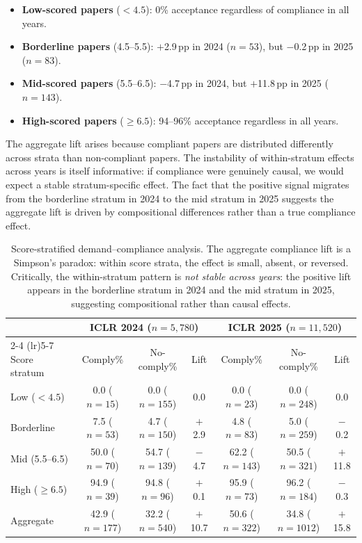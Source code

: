 \documentclass{article}
\begin{document}
\begin{itemize}[leftmargin=*]
\item \textbf{Low-scored papers} ($< 4.5$): 0\% acceptance regardless of compliance in all years.
\item \textbf{Borderline papers} (4.5--5.5): $+$2.9\,pp in 2024 ($n = 53$), but $-$0.2\,pp in 2025 ($n = 83$).
\item \textbf{Mid-scored papers} (5.5--6.5): $-$4.7\,pp in 2024, but $+$11.8\,pp in 2025 ($n = 143$).
\item \textbf{High-scored papers} ($\geq 6.5$): 94--96\% acceptance regardless in all years.
\end{itemize}

The aggregate lift arises because compliant papers are distributed differently across strata than non-compliant papers. The instability of within-stratum effects across years is itself informative: if compliance were genuinely causal, we would expect a stable stratum-specific effect. The fact that the positive signal migrates from the borderline stratum in 2024 to the mid stratum in 2025 suggests the aggregate lift is driven by compositional differences rather than a true compliance effect.

\begin{table}[t]
\centering
\caption{Score-stratified demand--compliance analysis. The aggregate compliance lift is a Simpson's paradox: within score strata, the effect is small, absent, or reversed. Critically, the within-stratum pattern is \emph{not stable across years}: the positive lift appears in the borderline stratum in 2024 and the mid stratum in 2025, suggesting compositional rather than causal effects.}
\label{tab:stratified}
\small
\begin{tabular}{@{}lccc|ccc@{}}
\toprule
& \multicolumn{3}{c|}{ICLR 2024 ($n = 5{,}780$)} & \multicolumn{3}{c}{ICLR 2025 ($n = 11{,}520$)} \\
\cmidrule(lr){2-4} \cmidrule(lr){5-7}
Score stratum & Comply\% & No-comply\% & Lift & Comply\% & No-comply\% & Lift \\
\midrule
Low ($< 4.5$) & 0.0 ($n\!=\!15$) & 0.0 ($n\!=\!155$) & 0.0 & 0.0 ($n\!=\!23$) & 0.0 ($n\!=\!248$) & 0.0 \\
Borderline & 7.5 ($n\!=\!53$) & 4.7 ($n\!=\!150$) & $+$2.9 & 4.8 ($n\!=\!83$) & 5.0 ($n\!=\!259$) & $-$0.2 \\
Mid (5.5--6.5) & 50.0 ($n\!=\!70$) & 54.7 ($n\!=\!139$) & $-$4.7 & 62.2 ($n\!=\!143$) & 50.5 ($n\!=\!321$) & $+$11.8 \\
High ($\geq 6.5$) & 94.9 ($n\!=\!39$) & 94.8 ($n\!=\!96$) & $+$0.1 & 95.9 ($n\!=\!73$) & 96.2 ($n\!=\!184$) & $-$0.3 \\
\midrule
Aggregate & 42.9 ($n\!=\!177$) & 32.2 ($n\!=\!540$) & $+$10.7 & 50.6 ($n\!=\!322$) & 34.8 ($n\!=\!1012$) & $+$15.8 \\
\bottomrule
\end{tabular}
\end{table}
\end{document}
